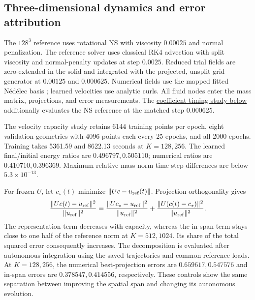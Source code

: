 \subsection{Three-dimensional dynamics and error attribution}
\label{app:3d-error}
The $128^3$ reference uses rotational NS with viscosity $0.00025$ and normal penalization. The reference solver uses {classical RK4 advection \citep{butcher2008numerical}} with split viscosity and normal-penalty updates at step $0.0025$. Reduced trial fields are zero-extended in the solid and integrated with the projected, unsplit grid generator at $0.00125$ and $0.000625$. Numerical fields use the mapped fitted N\'ed\'elec basis {\citep{nedelec1980mixed}}; learned velocities use analytic curls. All fluid nodes enter the mass matrix, projections, and error measurements. The \hyperref[app:coefficient-acceleration]{coefficient timing study below} additionally evaluates the NS reference at the matched step $0.000625$.

The velocity capacity study retains 6144 training points per epoch, eight validation geometries with 4096 points each every 25 epochs, and all 2000 epochs. Training takes 5361.59 and 8622.13 seconds at $K=128,256$. The learned final/initial energy ratios are $0.496797,0.505110$; numerical ratios are $0.410710,0.396369$. Maximum relative mass-norm time-step differences are below $5.3\times10^{-13}$.

For frozen $U$, let $c_\star(t)$ minimize $\lVert Uc-u_{\rm ref}(t)\rVert$. Projection orthogonality gives
\begin{equation}
\frac{\lVert Uc(t)-u_{\rm ref}\rVert^2}{\lVert u_{\rm ref}\rVert^2}
=\frac{\lVert Uc_\star-u_{\rm ref}\rVert^2}{\lVert u_{\rm ref}\rVert^2}
+\frac{\lVert U(c(t)-c_\star)\rVert^2}{\lVert u_{\rm ref}\rVert^2}.
\label{eq:error-split}
\end{equation}
The representation term decreases with capacity, whereas the in-span term stays close to one half of the reference norm at $K=512,1024$. Its share of the total squared error consequently increases. The decomposition is evaluated after autonomous integration using the saved trajectories and common reference loads. At $K=128,256$, the numerical best-projection errors are $0.659617,0.547576$ and in-span errors are $0.378547,0.414556$, respectively. These controls show the same separation between improving the spatial span and changing its autonomous evolution.

